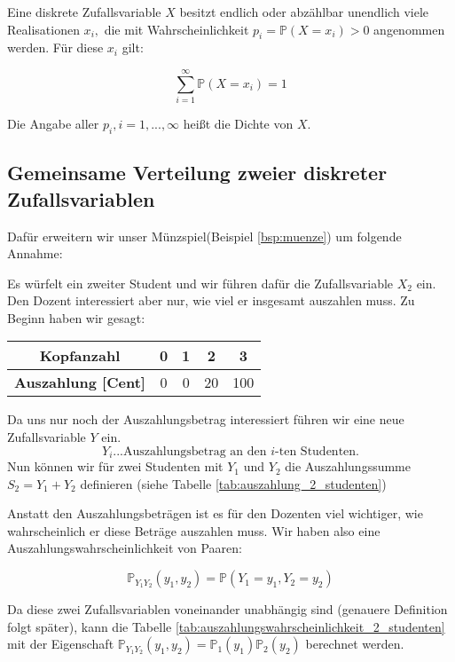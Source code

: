 {    Eine diskrete Zufallsvariable $X$ besitzt endlich oder abzählbar unendlich
    viele Realisationen $x_{i},$ die mit Wahrscheinlichkeit $p_{i}=\mathbb P\left(X=x_{i}\right)>0$
    angenommen werden. Für diese $x_{i}$ gilt: 

    \[\sum _{i=1}^{{\infty}}{\mathbb P\left(X=x_{i}\right)}=1\]

    Die Angabe aller $p_{i},i=1,...,{\infty}$ heißt die Dichte von $X$.

    \subsection{Gemeinsame Verteilung zweier diskreter Zufallsvariablen}
    \begin{bsp}\label{bsp:muenze_3}Dafür erweitern wir unser Münzspiel(Beispiel \ref{bsp:muenze}) um folgende Annahme: 

    Es würfelt ein zweiter Student und wir führen
    dafür die Zufallsvariable $X_{2}$ ein. Den Dozent interessiert aber nur, wie viel er insgesamt auszahlen
    muss. Zu Beginn haben wir gesagt:

    \begin{center}
    \begin{tabular}{ccccc}
    \textbf{Kopfanzahl} & 0 & 1 & 2 & 3\\
    \hline
    \textbf{Auszahlung [Cent]} & 0 & 0 & 20 & 100
    \end{tabular}
    \end{center}

    Da uns nur noch der Auszahlungsbetrag interessiert führen wir eine neue Zufallsvariable $Y$ ein.
    \[Y_i...\text{Auszahlungsbetrag an den }i\text{-ten Studenten.}\]
    Nun können wir für zwei Studenten mit $Y_{1}$ und $Y_{2}$ die Auszahlungssumme $S_{2}=Y_{1}+Y_{2}$ definieren 
    (siehe Tabelle \ref{tab:auszahlung_2_studenten})

    Anstatt den Auszahlungsbeträgen ist es für den Dozenten viel wichtiger,
    wie wahrscheinlich er diese Beträge auszahlen muss. Wir haben also eine
    Auszahlungswahrscheinlichkeit von Paaren:

    \[\mathbb P_{Y_{1}Y_{2}}\left(y_{1},y_{2}\right)=\mathbb P\left(Y_{1}=y_{1},Y_{2}=y_{2}\right)\]

    Da diese zwei Zufallsvariablen voneinander unabhängig sind (genauere Definition folgt später), kann %
    die Tabelle \ref{tab:auszahlungswahrscheinlichkeit_2_studenten} mit der Eigenschaft
    $\mathbb P_{Y_{1}Y_{2}}\left(y_{1},y_{2}\right)=\mathbb P_{1}\left(y_{1}\right)\mathbb P_{2}(y_{2})$
    berechnet werden.


\end{bsp}}
